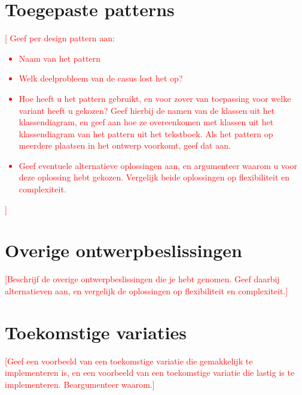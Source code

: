 \documentclass[a4paper]{article}
\newcommand{\todo}[1]{\textcolor{red}{[#1]}}
\begin{document}
\section{Toegepaste patterns}
\todo{ Geef per design pattern aan:
\begin{itemize}
	\item Naam van het pattern
	\item	Welk deelprobleem van de casus lost het op?
	\item	Hoe heeft u het pattern gebruikt, en voor zover van toepassing voor welke variant heeft u gekozen? Geef hierbij de namen van de klassen uit het klassendiagram, en geef aan hoe ze overeenkomen met klassen uit het klassendiagram van het pattern uit het tekstboek. Als het pattern op meerdere plaatsen in het ontwerp voorkomt, geef dat aan.
	\item	Geef eventuele alternatieve oplossingen aan, en argumenteer waarom u voor deze oplossing hebt gekozen. Vergelijk beide oplossingen op flexibiliteit en complexiteit.
	\end{itemize}
}

\section{Overige ontwerpbeslissingen}
\todo{Beschrijf de overige ontwerpbeslissingen die je hebt genomen. Geef daarbij alternatieven aan, en vergelijk de oplossingen op flexibiliteit en complexiteit.}

\section{Toekomstige variaties}
\todo{Geef een voorbeeld van een toekomstige variatie die gemakkelijk te implementeren is, en een voorbeeld van een toekomstige variatie die lastig is te implementeren. Beargumenteer waarom.}
\end{document}
